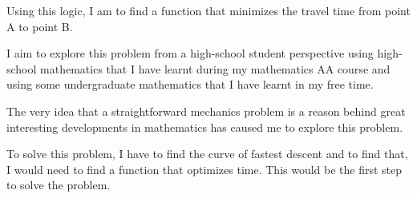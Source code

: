{Using this logic, I am to find a function that minimizes the travel time from point A to point B.}

{I aim to explore this problem from a high-school student perspective using high-school mathematics that I have learnt during my mathematics AA course and using some undergraduate mathematics that I have learnt in my free time.}

{The very idea that a straightforward mechanics problem is a reason behind great interesting developments in mathematics has caused me to explore this problem.}

{To solve this problem, I have to find the curve of fastest descent and to find that, I would need to find a function that optimizes time. This would be the first step to solve the problem.}


